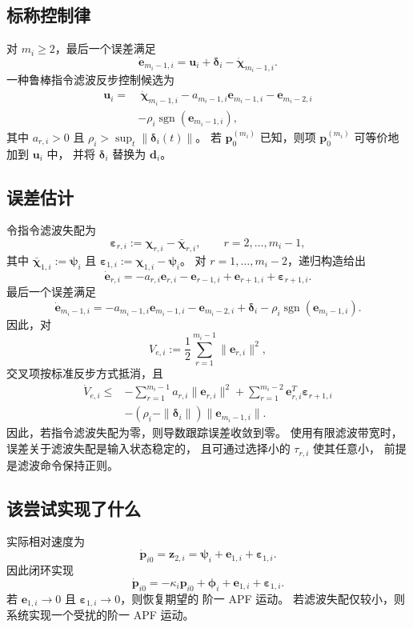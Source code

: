 \subsection{标称控制律}

对 $m_i\ge2$，最后一个误差满足
\[
    \dot{\bm e}_{m_i-1,i}
    =\bm u_i+\bm\delta_i-\dot{\bm\chi}_{m_i-1,i}.
\]
一种鲁棒指令滤波反步控制候选为
\[
\begin{aligned}
    \bm u_i
    =&\ \dot{\bm\chi}_{m_i-1,i}
      -a_{m_i-1,i}\bm e_{m_i-1,i}
      -\bm e_{m_i-2,i} \\
     &-\rho_i\operatorname{sgn}(\bm e_{m_i-1,i}),
\end{aligned}
\]
其中 $a_{r,i}>0$ 且 $\rho_i>\sup_t\|\bm\delta_i(t)\|$。
若 $\bm p_0^{(m_i)}$ 已知，则项 $\bm p_0^{(m_i)}$ 可等价地加到 $\bm u_i$ 中，
并将 $\bm\delta_i$ 替换为 $\bm d_i$。

\subsection{误差估计}

令指令滤波失配为
\[
    \bm\varepsilon_{r,i}
    :=\bm\chi_{r,i}-\bar{\bm\chi}_{r,i},
    \qquad r=2,\dots,m_i-1,
\]
其中 $\bar{\bm\chi}_{1,i}:=\bm\psi_i$ 且
$\bm\varepsilon_{1,i}:=\bm\chi_{1,i}-\bm\psi_i$。
对 $r=1,\dots,m_i-2$，递归构造给出
\[
    \dot{\bm e}_{r,i}
    =-a_{r,i}\bm e_{r,i}
      -\bm e_{r-1,i}
      +\bm e_{r+1,i}
      +\bm\varepsilon_{r+1,i}.
\]
最后一个误差满足
\[
    \dot{\bm e}_{m_i-1,i}
    =-a_{m_i-1,i}\bm e_{m_i-1,i}
      -\bm e_{m_i-2,i}
      +\bm\delta_i
      -\rho_i\operatorname{sgn}(\bm e_{m_i-1,i}).
\]
因此，对
\[
    V_{e,i}:=\frac12\sum_{r=1}^{m_i-1}\|\bm e_{r,i}\|^2,
\]
交叉项按标准反步方式抵消，且
\[
\begin{aligned}
    \dot V_{e,i}
    \le&
    -\sum_{r=1}^{m_i-1}a_{r,i}\|\bm e_{r,i}\|^2
    +\sum_{r=1}^{m_i-2}\bm e_{r,i}^{T}\bm\varepsilon_{r+1,i}\\
    &-(\rho_i-\|\bm\delta_i\|)\|\bm e_{m_i-1,i}\|.
\end{aligned}
\]
因此，若指令滤波失配为零，则导数跟踪误差收敛到零。
使用有限滤波带宽时，误差关于滤波失配是输入状态稳定的，
且可通过选择小的 $\tau_{r,i}$ 使其任意小，
前提是滤波命令保持正则。

\subsection{该尝试实现了什么}

实际相对速度为
\[
    \dot{\bm p}_{i0}
    =\bm z_{2,i}
    =\bm\psi_i+\bm e_{1,i}+\bm\varepsilon_{1,i}.
\]
因此闭环实现
\[
    \dot{\bm p}_{i0}
    =-\kappa_i\bm p_{i0}+\bm\phi_i
      +\bm e_{1,i}+\bm\varepsilon_{1,i}.
\]
若 $\bm e_{1,i}\to0$ 且 $\bm\varepsilon_{1,i}\to0$，则恢复期望的
阶一 APF 运动。
若滤波失配仅较小，则系统实现一个受扰的阶一 APF 运动。

